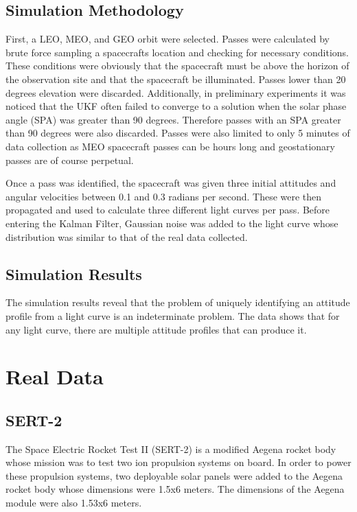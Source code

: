 \subsection{Simulation Methodology}

First, a LEO, MEO, and GEO orbit were selected. Passes were calculated by brute force sampling a spacecrafts location and checking for necessary conditions. These conditions were obviously that the spacecraft must be above the horizon of the observation site and that the spacecraft be illuminated. Passes lower than 20 degrees elevation were discarded. Additionally, in preliminary experiments it was noticed that the UKF often failed to converge to a solution when the solar phase angle (SPA) was greater than 90 degrees. Therefore passes with an SPA greater than 90 degrees were also discarded. Passes were also limited to only 5 minutes of data collection as MEO spacecraft passes can be hours long and geostationary passes are of course perpetual.

Once a pass was identified, the spacecraft was given three initial attitudes and angular velocities between 0.1 and 0.3 radians per second. These were then propagated and used to calculate three different light curves per pass. Before entering the Kalman Filter, Gaussian noise was added to the light curve whose distribution was similar to that of the real data collected.
\subsection{Simulation Results}

The simulation results reveal that the problem of uniquely identifying an attitude profile from a light curve is an indeterminate problem. The data shows that for any light curve, there are multiple attitude profiles that can produce it.

\section{Real Data}

\subsection{SERT-2}

The Space Electric Rocket Test II (SERT-2) is a modified Aegena rocket body whose mission was to test two ion propulsion systems on board. \cite{sert2} In order to power these propulsion systems, two deployable solar panels were added to the Aegena rocket body whose dimensions were 1.5x6 meters. The dimensions of the Aegena module were also 1.53x6 meters.

